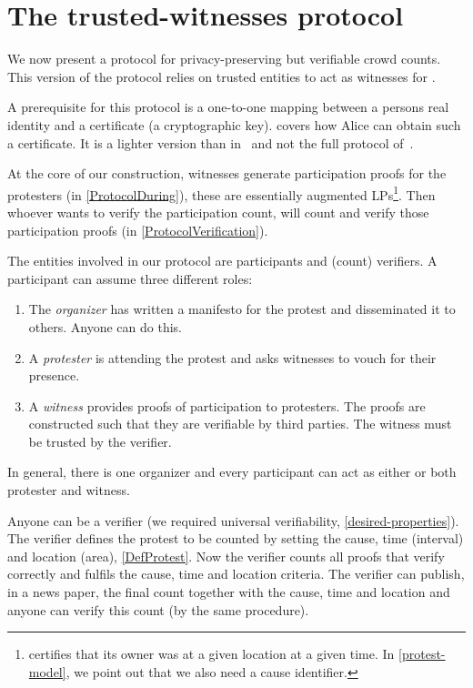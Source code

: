 \section{The trusted-witnesses protocol}%
\label{trusted-witnesses-protocol}

We now present a protocol for privacy-preserving but verifiable crowd
counts.
This version of the protocol relies on trusted entities to act as witnesses for 
.

A prerequisite for this protocol is a one-to-one mapping between a persons real 
identity and a certificate (\ie a cryptographic key).
 covers how Alice can obtain such a certificate.
It is a lighter version than in~\cite{SelfCertifiedSybilFreePseudonyms} and not 
the full protocol of~\cite{HowToWinTheCloneWars}.

At the core of our construction, witnesses generate participation proofs for 
the protesters (in \cref{ProtocolDuring}), these are essentially augmented 
\acp{LP}\footnote{%
   certifies that its owner was at a given location at a given time.
  In \cref{protest-model}, we point out that we also need a cause identifier.
}.
Then whoever wants to verify the participation count, will count and verify 
those participation proofs (in \cref{ProtocolVerification}). 

The entities involved in our protocol are participants and (count) verifiers.
A participant can assume three different roles:
\begin{enumerate}
\item The \emph{organizer} has written a manifesto for the protest and 
  disseminated it to others.
  Anyone can do this.
\item A \emph{protester} is attending the protest and asks witnesses to vouch 
  for their presence.
\item A \emph{witness} provides proofs of participation to protesters.
  The proofs are constructed such that they are verifiable by third parties.
  The witness must be trusted by the verifier.
\end{enumerate}
In general, there is one organizer and every participant can act as
either or both protester and witness.

Anyone can be a verifier (we required universal verifiability, 
\cref{desired-properties}).
The verifier defines the protest to be counted by setting the cause, time 
(interval) and location (area), \cf \cref{DefProtest}.
Now the verifier counts all proofs that verify correctly and fulfils the cause, 
time and location criteria.
The verifier can publish, \eg in a news paper, the final count together with 
the cause, time and location and anyone can verify this count (by the same 
procedure).


